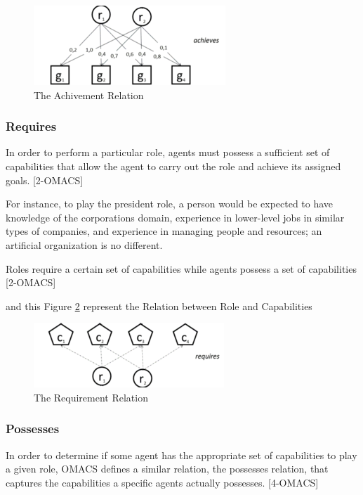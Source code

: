 \begin{figure}[th]
	\centering
		\includegraphics{chapiter1/img/a}
	\caption{\label{fig:The Achivement Relation}The Achivement Relation }
\end{figure}
 

\subsubsection{Requires}

In order to perform a particular role, agents must possess a sufficient set of capabilities that allow
the agent to carry out the role and achieve its assigned goals. [2-OMACS]

For instance, to play the  president role,
 a person would be expected to have knowledge of the corporations domain, experience in
lower-level jobs in similar types of companies, and experience in managing people and resources;
an artificial organization is no different. 

Roles require a certain set of capabilities while agents
possess a set of capabilities [2-OMACS]


and this Figure \ref{fig:The Requirment Relation} represent the Relation between Role and Capabilities 

\begin{figure}[th]
	\centering
		\includegraphics{chapiter1/img/r}
	\caption{\label{fig:The Requirment Relation}The Requirement Relation }
\end{figure}



\subsubsection{Possesses}
In order to determine if some agent has the appropriate set of capabilities to play a given role, OMACS defines a similar relation, the possesses relation, that captures the capabilities a specific agents actually possesses. [4-OMACS]

